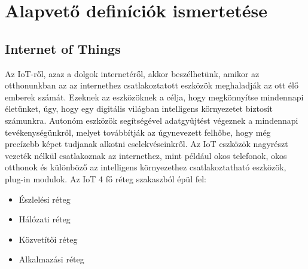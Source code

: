 \chapter{Alapvető definíciók ismertetése}

\section{Internet of Things}
Az IoT-ről, azaz a dolgok internetéről, akkor beszélhetünk, amikor az otthonunkban az az internethez csatlakoztatott eszközök meghaladják az ott élő emberek számát. Ezeknek az eszközöknek a célja, hogy megkönnyítse mindennapi életünket, úgy, hogy egy digitális világban intelligens környezetet biztosít számunkra. Autonóm eszközök segítségével adatgyűjtést végeznek a mindennapi tevékenységünkről, melyet továbbítják az úgynevezett felhőbe, hogy még precízebb képet tudjanak alkotni cselekvéseinkről. Az IoT eszközök nagyrészt vezeték nélkül csatlakoznak az internethez, mint például okos telefonok, okos otthonok és különböző az intelligens környezethez csatlakoztatható eszközök, plug-in modulok.
\newline Az IoT 4 fő réteg szakaszból épül fel:\cite{smart-research}
\begin{itemize}
    \setlength\itemsep{-2pt}
    \item Észlelési réteg
    \item Hálózati réteg
    \item Közvetítői réteg
    \item Alkalmazási réteg 
\end{itemize}

